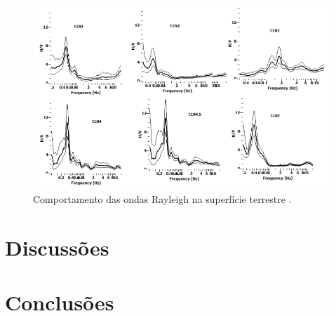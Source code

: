 \documentclass[smallextended]{svjour3}       %
\begin{document}
\begin{figure}[!hbtp]
  \begin{center}
  
  \includegraphics[scale=0.5]{Figures/fig5.png}
  \end{center}
  \caption{Comportamento das ondas Rayleigh na superfície terrestre \citep{de2009filtragem}.}
  \label{hv_curva}
\end{figure}
\newpage



\section{Discussões}




\section{Conclusões}
\label{conclusions}




\end{document}
